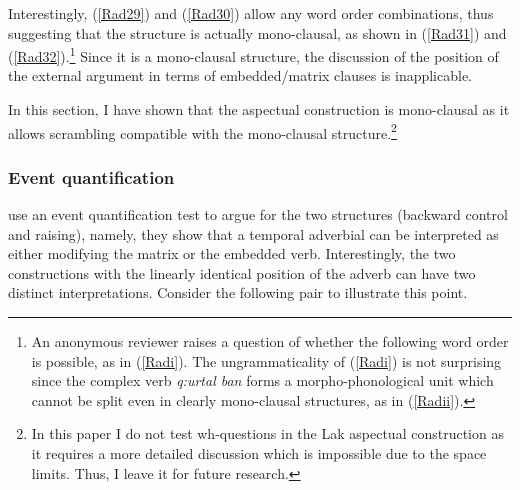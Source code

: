 \documentclass[output=paper]{langscibook}
\begin{document}
Interestingly, (\ref{Rad29}) and (\ref{Rad30}) allow any word order combinations, thus suggesting that the structure is actually mono-clausal, as shown in (\ref{Rad31}) and (\ref{Rad32}).\footnote{An anonymous reviewer raises a question of whether the following word order is possible, as in (\ref{Radi}). The ungrammaticality of (\ref{Radi}) is not surprising since the complex verb \textit{q:urtal ban} forms a morpho-phonological unit which cannot be split even in clearly mono-clausal structures, as in (\ref{Radii}).

\z}
Since it is a mono-clausal structure, the discussion of the position of the external argument in terms of embedded/matrix clauses is inapplicable.

\ea\label{Rad31}
\z
\ex\label{Rad32}
\z 
\z 


In this section, I have shown that the aspectual construction is mono-clausal as it allows scrambling compatible with the mono-clausal structure.\footnote{In this paper I do not test wh-questions in the Lak aspectual construction as it requires a more detailed discussion which is impossible due to the space limits. Thus, I leave it for future research.}

\subsubsection{Event quantification}
\citet{PolinskyPotsdam2002} use an event quantification test to argue for the two structures (backward control and raising), namely, they show that a temporal adverbial can be interpreted as either modifying the matrix or the embedded verb. Interestingly, the two constructions with the linearly identical position of the adverb can have two distinct interpretations. Consider the following pair to illustrate this point.
\end{document}
